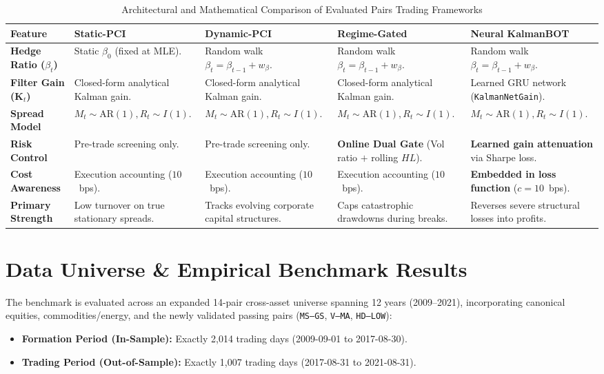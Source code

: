 \documentclass[11pt, a4paper]{article}
\begin{document}
\begin{table}[h!]
\centering
\small
\setlength{\tabcolsep}{3.5pt}
\caption{Architectural and Mathematical Comparison of Evaluated Pairs Trading Frameworks}
\label{tab:methodology_comparison}
\begin{tabularx}{\textwidth}{lXXXX}
\toprule
\textbf{Feature} & \textbf{Static-PCI} & \textbf{Dynamic-PCI} & \textbf{Regime-Gated} & \textbf{Neural KalmanBOT} \\
\midrule
\textbf{Hedge Ratio ($\beta_t$)} & Static $\beta_0$ (fixed at MLE). & Random walk $\beta_t = \beta_{t-1} + w_\beta$. & Random walk $\beta_t = \beta_{t-1} + w_\beta$. & Random walk $\beta_t = \beta_{t-1} + w_\beta$. \\
\addlinespace
\textbf{Filter Gain ($\mathbf{K}_t$)} & Closed-form analytical Kalman gain. & Closed-form analytical Kalman gain. & Closed-form analytical Kalman gain. & Learned GRU network (\texttt{KalmanNetGain}). \\
\addlinespace
\textbf{Spread Model} & $M_t \sim \text{AR}(1), R_t \sim I(1)$. & $M_t \sim \text{AR}(1), R_t \sim I(1)$. & $M_t \sim \text{AR}(1), R_t \sim I(1)$. & $M_t \sim \text{AR}(1), R_t \sim I(1)$. \\
\addlinespace
\textbf{Risk Control} & Pre-trade screening only. & Pre-trade screening only. & \textbf{Online Dual Gate} (Vol ratio $+$ rolling $HL$). & \textbf{Learned gain attenuation} via Sharpe loss. \\
\addlinespace
\textbf{Cost Awareness} & Execution accounting ($10$~bps). & Execution accounting ($10$~bps). & Execution accounting ($10$~bps). & \textbf{Embedded in loss function} ($c = 10$~bps). \\
\addlinespace
\textbf{Primary Strength} & Low turnover on true stationary spreads. & Tracks evolving corporate capital structures. & Caps catastrophic drawdowns during breaks. & Reverses severe structural losses into profits. \\
\bottomrule
\end{tabularx}
\end{table}

\section{Data Universe \& Empirical Benchmark Results}

The benchmark is evaluated across an expanded 14-pair cross-asset universe spanning 12 years (2009--2021), incorporating canonical equities, commodities/energy, and the newly validated passing pairs (\texttt{MS--GS}, \texttt{V--MA}, \texttt{HD--LOW}):
\begin{itemize}
    \item \textbf{Formation Period (In-Sample):} Exactly 2,014 trading days (2009-09-01 to 2017-08-30).
    \item \textbf{Trading Period (Out-of-Sample):} Exactly 1,007 trading days (2017-08-31 to 2021-08-31).
\end{itemize}
\end{document}
